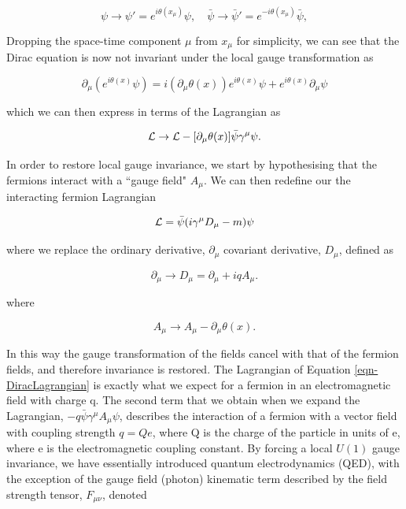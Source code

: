 \begin{equation}
\psi \to \psi'= e^{i \theta(x_{\mu})}\psi, \quad \bar{\psi} \to \bar{\psi}' = e^{- i \theta(x_{\mu})}\bar{\psi},
\end{equation} 

Dropping the space-time component $\mu$ from $x_{\mu}$ for simplicity, we can see that the Dirac equation is now not invariant under the local 
gauge transformation as

\begin{equation}
\partial_{\mu} (e^{i\theta(x)}\psi) = i(\partial_{\mu}\theta(x))e^{i\theta(x)}\psi + e^{i\theta(x)} \partial_{\mu}\psi 
\end{equation}

which we can then express in terms of the Lagrangian as

\begin{equation}
\mathcal{L} \to \mathcal{L} - [\partial_{\mu} \theta(x)] \bar{\psi} \gamma^{\mu} \psi.
\end{equation}

In order to restore local gauge invariance, we start by hypothesising that the fermions interact with a ``gauge field" $A_{\mu}$. We can then 
redefine our the interacting fermion Lagrangian 

\begin{equation} 
\mathcal{L} = \bar{\psi}(i \gamma^{\mu}D_{\mu}-m)\psi
\end{equation}

where we replace the ordinary derivative, $\partial_{\mu}$ covariant derivative, $D_{\mu}$, defined as

\begin{equation}
\partial_{\mu} \to D_{\mu} = \partial_{\mu} + iqA_{\mu}.
\end{equation}

where

\begin{equation}
A_{\mu} \to A_{\mu} - \partial_{\mu} \theta (x).
\end{equation}

In this way the gauge transformation of the fields cancel with that of the fermion fields, and therefore invariance is restored. The Lagrangian 
of Equation \ref{eqn-DiracLagrangian} is exactly what we expect for a fermion in an electromagnetic field with charge q. The second term that we obtain when we expand the 
Lagrangian, $-q\bar{\psi}\gamma^{\mu}A_{\mu}\psi$, describes the interaction of a fermion with a vector field with coupling strength $q=Qe$, 
where Q is the charge of the particle in units of e, where e is the electromagnetic coupling constant. By forcing a local $U(1)$ gauge 
invariance, we have essentially introduced quantum electrodynamics (QED), with the exception of the gauge field (photon) kinematic term 
described by the field strength tensor, $F_{\mu \nu}$, denoted  

